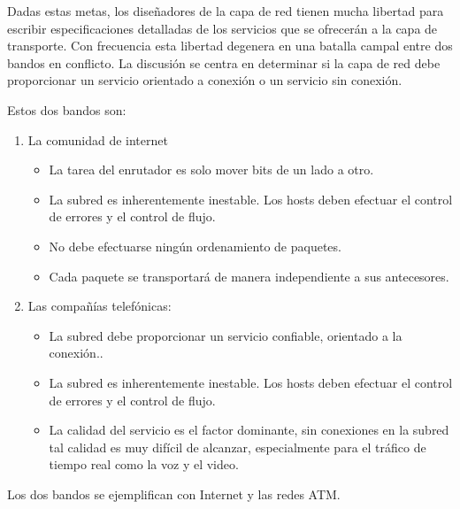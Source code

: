 \documentclass[10pt,a4paper]{report}
\begin{document}
\par Dadas estas metas, los diseñadores de la capa de red tienen mucha libertad para 
escribir especificaciones detalladas de los servicios que se ofrecerán a la capa de 
transporte. Con frecuencia esta libertad degenera en una batalla campal entre dos 
bandos en conflicto. La discusión se centra en determinar si la capa de red debe 
proporcionar un servicio orientado a conexión o un servicio sin conexión.
\par Estos dos bandos son:
	\begin{enumerate}
		\item La comunidad de internet
		\begin{itemize}\itemsep=0pt
			\item La tarea del enrutador es solo mover bits de un lado a otro.
			\item La subred es inherentemente inestable. Los hosts deben efectuar el 
			control de errores y el control de flujo.
			\item No debe efectuarse ningún ordenamiento de paquetes.
			\item Cada paquete se transportará de manera independiente a sus 
			antecesores.
			\end{itemize}
		\item Las compañías telefónicas:
		\begin{itemize}\itemsep=0pt
			\item La subred debe proporcionar un servicio confiable, orientado a la
conexión..
			\item La subred es inherentemente inestable. Los hosts deben efectuar el 
			control de errores y el control de flujo.
			\item La calidad del servicio es el factor dominante, sin conexiones en la 
			subred tal calidad es muy difícil de alcanzar, especialmente para el tráfico de 
			tiempo real como la voz y el video.
		\end{itemize}
	\end{enumerate}
\par Los dos bandos se ejemplifican con Internet y las redes ATM.
\end{document}
